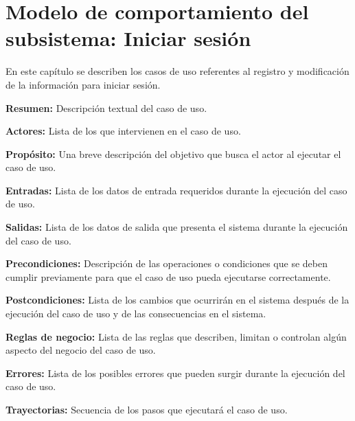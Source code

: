 

\chapter{Modelo de comportamiento del subsistema: Iniciar sesión \label{chp:iniciarSesion}}
En este capítulo se describen los casos de uso referentes al registro y modificación de la información para iniciar sesión. \bigskip

     \begin{objetivos}
	\item {\bf Resumen:} Descripción textual del caso de uso.
	\item {\bf Actores:} Lista de los 
	 que intervienen en el caso de uso.
	\item {\bf Propósito:} Una breve descripción del objetivo que busca el actor al ejecutar el caso de uso.
	\item {\bf Entradas:} Lista de los datos de entrada requeridos durante la ejecución del caso de uso.
	\item {\bf Salidas:} Lista de los datos de salida que presenta el sistema durante la ejecución del caso de uso.
	\item {\bf Precondiciones:} Descripción de las operaciones o condiciones que se deben cumplir previamente para que el caso de uso pueda ejecutarse correctamente.
	\item {\bf Postcondiciones:} Lista de los cambios que ocurrirán en el sistema después de la ejecución del caso de uso y de las consecuencias en el sistema.
	\item {\bf Reglas de negocio:} Lista de las reglas que describen, limitan o controlan algún aspecto del negocio del caso de uso.
	\item {\bf Errores:} Lista de los posibles errores que pueden surgir durante la ejecución del caso de uso.
	\item {\bf Trayectorias:} Secuencia de los pasos que ejecutará el caso de uso.
    \end{objetivos}

	
	
	
	

	
